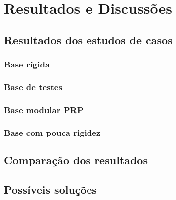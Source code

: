 \chapter{Resultados e Discussões}



\section{Resultados dos estudos de casos}

\subsection{Base rígida}

\subsection{Base de testes}

\subsection{Base modular PRP}

\subsection{Base com pouca rigidez}


\section{Comparação dos resultados}


\section{Possíveis soluções}